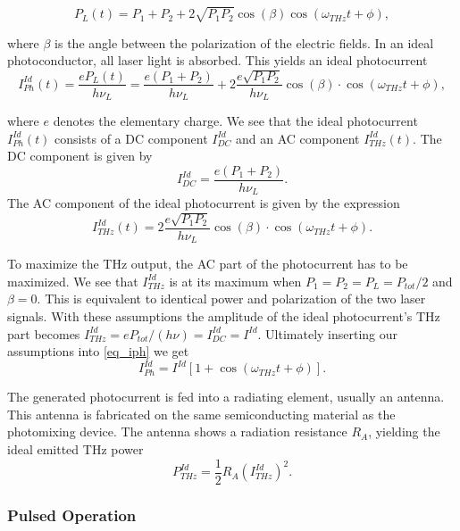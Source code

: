 \begin{equation}
	P_L(t) = P_1 + P_2 + 2\sqrt{P_1 P_2}\cos(\beta)\cos(\omega_{THz}t + \phi), 
\end{equation}

where $\beta$ is the angle between the polarization of the electric fields. In an ideal photoconductor, all laser light is absorbed. This yields an ideal photocurrent 
\begin{equation}
	I_{Ph}^{Id}(t) = \frac{eP_L(t)}{h\nu_L} = \frac{e(P_1+P_2)}{h\nu_L} + 2\frac{e\sqrt{P_1P_2}}{h\nu_L}\cos(\beta)\cdot\cos(\omega_{THz}t + \phi),
	\label{eq_iph}
\end{equation}

where $e$ denotes the elementary charge.
We see that the ideal photocurrent $I_{Ph}^{Id}(t)$ consists of a DC component $I_{DC}^{Id}$ and an AC component $I_{THz}^{Id}(t)$.
The DC component is given by 
\begin{equation}
	I_{DC}^{Id} = \frac{e(P_1+P_2)}{h\nu_L}.
\end{equation} 
The AC component of the ideal photocurrent is given by the expression
\begin{equation}
	I_{THz}^{Id}(t) = 2\frac{e\sqrt{P_1P_2}}{h\nu_L}\cos(\beta)\cdot\cos(\omega_{THz}t + \phi).
\end{equation}

To maximize the THz output, the AC part of the photocurrent has to be maximized. We see that $I_{THz}^{Id}$ is at its maximum when $P_1 = P_2 = P_L = P_{tot} / 2$ and $\beta = 0$. This is equivalent to identical power and polarization of the two laser signals. With these assumptions the amplitude of the ideal photocurrent's THz part becomes $I_{THz}^{Id} = eP_{tot} / (h\nu) = I_{DC}^{Id} = I^{Id}$. Ultimately inserting our assumptions into \ref{eq_iph} we get 
\begin{equation}
	I_{Ph}^{Id} = I^{Id}[1 + \cos(\omega_{THz}t + \phi)].
	\label{eq8}
\end{equation}

The generated photocurrent is fed into a radiating element, usually an antenna. This antenna is fabricated on the same semiconducting material as the photomixing device. The antenna shows a radiation resistance $R_A$, yielding the ideal emitted THz power 
\begin{equation}
	P_{THz}^{Id}=\frac{1}{2}R_A (I_{THz}^{Id})^2.
	\label{eq_thz_pow}
\end{equation}

\subsubsection{Pulsed Operation}

